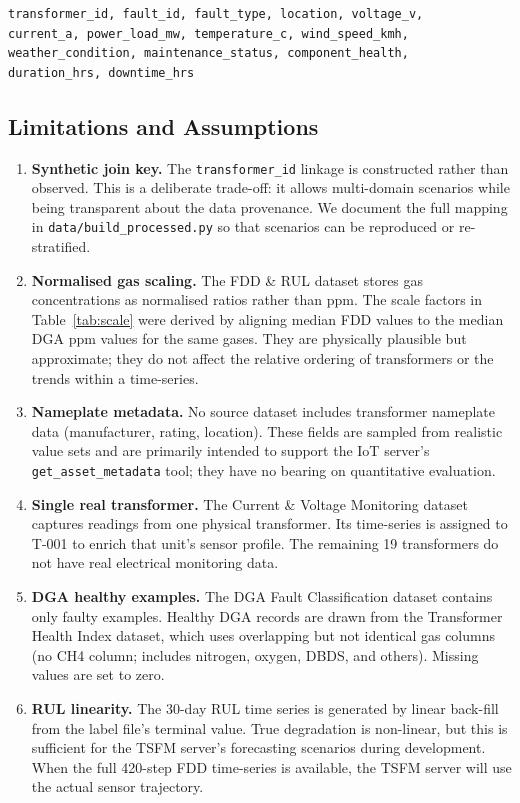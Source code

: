\begin{verbatim}
transformer_id, fault_id, fault_type, location, voltage_v,
current_a, power_load_mw, temperature_c, wind_speed_kmh,
weather_condition, maintenance_status, component_health,
duration_hrs, downtime_hrs
\end{verbatim}

\subsection{Limitations and Assumptions}
\label{sec:limitations}

\begin{enumerate}

\item \textbf{Synthetic join key.}  The \texttt{transformer\_id} linkage is
constructed rather than observed.  This is a deliberate trade-off: it allows
multi-domain scenarios while being transparent about the data provenance.  We
document the full mapping in \texttt{data/build\_processed.py} so that
scenarios can be reproduced or re-stratified.

\item \textbf{Normalised gas scaling.}  The FDD \& RUL dataset stores gas
concentrations as normalised ratios rather than ppm.  The scale factors in
Table~\ref{tab:scale} were derived by aligning median FDD values to the median
DGA ppm values for the same gases.  They are physically plausible but
approximate; they do not affect the relative ordering of transformers or the
trends within a time-series.

\item \textbf{Nameplate metadata.}  No source dataset includes transformer
nameplate data (manufacturer, rating, location).  These fields are sampled from
realistic value sets and are primarily intended to support the IoT server's
\texttt{get\_asset\_metadata} tool; they have no bearing on quantitative
evaluation.

\item \textbf{Single real transformer.}  The Current \& Voltage Monitoring
dataset captures readings from one physical transformer.  Its time-series is
assigned to T-001 to enrich that unit's sensor profile.  The remaining 19
transformers do not have real electrical monitoring data.

\item \textbf{DGA healthy examples.}  The DGA Fault Classification dataset
contains only faulty examples.  Healthy DGA records are drawn from the
Transformer Health Index dataset, which uses overlapping but not identical gas
columns (no CH4 column; includes nitrogen, oxygen, DBDS, and others).  Missing
values are set to zero.

\item \textbf{RUL linearity.}  The 30-day RUL time series is generated by
linear back-fill from the label file's terminal value.  True degradation is
non-linear, but this is sufficient for the TSFM server's forecasting scenarios
during development.  When the full 420-step FDD time-series is available, the
TSFM server will use the actual sensor trajectory.

\end{enumerate}

